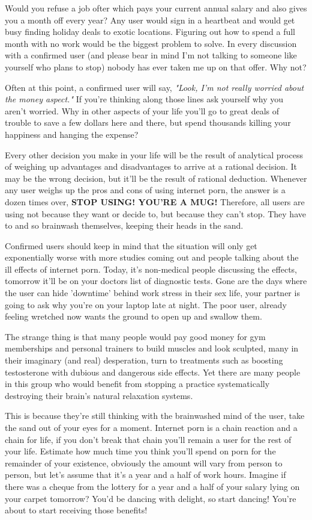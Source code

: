 \documentclass[easypeasy.tex]{subfiles}
\begin{document}
Would you refuse a job ofter which pays your current annual salary and also gives you a month off every year? Any user would sign in a heartbeat and would get busy finding holiday deals to exotic locations. Figuring out how to spend a full month with no work would be the biggest problem to solve. In every discussion with a confirmed user (and please bear in mind I'm not talking to someone like yourself who plans to stop) nobody has ever taken me up on that offer. Why not?

Often at this point, a confirmed user will say, \textit{"Look, I'm not really worried about the money aspect."} If you're thinking along those lines ask yourself why you aren't worried. Why in other aspects of your life you'll go to great deals of trouble to save a few dollars here and there, but spend thousands killing your happiness and hanging the expense?

Every other decision you make in your life will be the result of analytical process of weighing up advantages and disadvantages to arrive at a rational decision. It may be the wrong decision, but it'll be the result of rational deduction. Whenever any user weighs up the pros and cons of using internet porn, the answer is a dozen times over, \textbf{STOP USING! YOU'RE A MUG!} Therefore, all users are using not because they want or decide to, but because they can't stop. They have to and so brainwash themselves, keeping their heads in the sand.

Confirmed users should keep in mind that the situation will only get exponentially worse with more studies coming out and people talking about the ill effects of internet porn. Today, it's non-medical people discussing the effects, tomorrow it'll be on your doctors list of diagnostic tests. Gone are the days where the user can hide 'downtime' behind work stress in their sex life, your partner is going to ask why you're on your laptop late at night. The poor user, already feeling wretched now wants the ground to open up and swallow them.

The strange thing is that many people would pay good money for gym memberships and personal trainers to build muscles and look sculpted, many in their imaginary (and real) desperation, turn to treatments such as boosting testosterone with dubious and dangerous side effects. Yet there are many people in this group who would benefit from stopping a practice systematically destroying their brain's natural relaxation systems.

This is because they're still thinking with the brainwashed mind of the user, take the sand out of your eyes for a moment. Internet porn is a chain reaction and a chain for life, if you don't break that chain you'll remain a user for the rest of your life. Estimate how much time you think you'll spend on porn for the remainder of your existence, obviously the amount will vary from person to person, but let's assume that it's a year and a half of work hours. Imagine if there was a cheque from the lottery for a year and a half of your salary lying on your carpet tomorrow? You'd be dancing with delight, so start dancing! You're about to start receiving those benefits!
\end{document}
